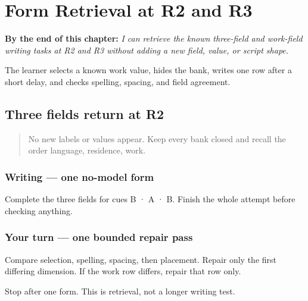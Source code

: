 
\chapter{Form Retrieval at R2 and R3}
\label{ch:pa-form-r2-r3-retrieval}

\begin{chapteropening}
\textbf{By the end of this chapter:} \emph{I can retrieve the known three-field and work-field writing tasks at R2 and R3 without adding a new field, value, or script shape.}

The learner selects a known work value, hides the bank, writes one row after a short delay, and checks spelling, spacing, and field agreement.
\end{chapteropening}

\section[\texorpdfstring{\pa{ਭਾਸ਼ਾ} · \pa{ਰਿਹਾਇਸ਼} · \pa{ਕੰਮ} (three-field …)}{ਭਾਸ਼ਾ · ਰਿਹਾਇਸ਼ · ਕੰਮ (three-field …)}]{Three fields return at R2}

\label{lesson:PA-R26-three-repair-r2}



\begin{quote}
No new labels or values appear. Keep every bank closed and recall the order language, residence, work.
\end{quote}

\subsection*{Writing — one no-model form}
Complete the three fields for cues B · A · B. Finish the whole attempt before checking anything.

\subsection*{Your turn — one bounded repair pass}
Compare selection, spelling, spacing, then placement. Repair only the first differing dimension. If the work row differs, repair that row only.

\begin{tcolorbox}[breakable,colback=teal!4,colframe=teal!35!black,title={Before you move on}]
Stop after one form. This is retrieval, not a longer writing test.
\end{tcolorbox}
